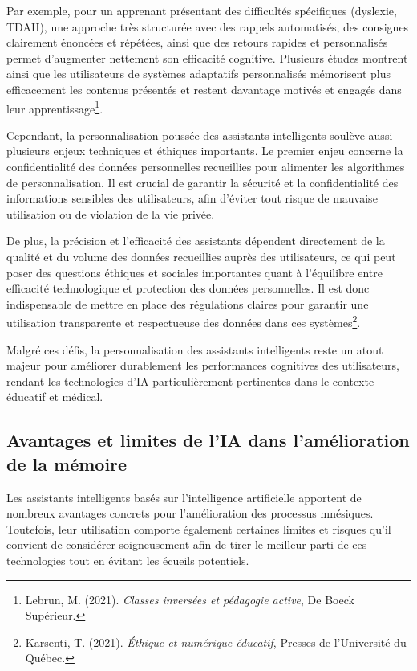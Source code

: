 \documentclass[11pt,a4paper]{report}
\begin{document}
Par exemple, pour un apprenant présentant des difficultés spécifiques (dyslexie, TDAH), une approche très structurée avec des rappels automatisés, des consignes clairement énoncées et répétées, ainsi que des retours rapides et personnalisés permet d'augmenter nettement son efficacité cognitive. Plusieurs études montrent ainsi que les utilisateurs de systèmes adaptatifs personnalisés mémorisent plus efficacement les contenus présentés et restent davantage motivés et engagés dans leur apprentissage\footnote{Lebrun, M. (2021). \textit{Classes inversées et pédagogie active}, De Boeck Supérieur.}.

Cependant, la personnalisation poussée des assistants intelligents soulève aussi plusieurs enjeux techniques et éthiques importants. Le premier enjeu concerne la confidentialité des données personnelles recueillies pour alimenter les algorithmes de personnalisation. Il est crucial de garantir la sécurité et la confidentialité des informations sensibles des utilisateurs, afin d'éviter tout risque de mauvaise utilisation ou de violation de la vie privée.

De plus, la précision et l’efficacité des assistants dépendent directement de la qualité et du volume des données recueillies auprès des utilisateurs, ce qui peut poser des questions éthiques et sociales importantes quant à l'équilibre entre efficacité technologique et protection des données personnelles. Il est donc indispensable de mettre en place des régulations claires pour garantir une utilisation transparente et respectueuse des données dans ces systèmes\footnote{Karsenti, T. (2021). \textit{Éthique et numérique éducatif}, Presses de l’Université du Québec.}.

Malgré ces défis, la personnalisation des assistants intelligents reste un atout majeur pour améliorer durablement les performances cognitives des utilisateurs, rendant les technologies d'IA particulièrement pertinentes dans le contexte éducatif et médical.

\subsection{Avantages et limites de l’IA dans l’amélioration de la mémoire}

Les assistants intelligents basés sur l’intelligence artificielle apportent de nombreux avantages concrets pour l'amélioration des processus mnésiques. Toutefois, leur utilisation comporte également certaines limites et risques qu’il convient de considérer soigneusement afin de tirer le meilleur parti de ces technologies tout en évitant les écueils potentiels.
\end{document}
